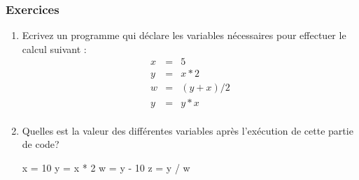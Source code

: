 \subsubsection{Exercices}

\begin{enumerate}
    \item Ecrivez un programme qui déclare les variables nécessaires pour effectuer le 
        calcul suivant :
        \begin{eqnarray*}
            x &=& 5\\
            y &=& x * 2\\
            w &=& ( y + x ) / 2\\
            y &=& y * x\\
        \end{eqnarray*}

    \item Quelles est la valeur des différentes variables après l'exécution de
        cette partie de code?

\begin{python}
x = 10
y = x * 2
w = y - 10
z = y / w
\end{python}
\end{enumerate}